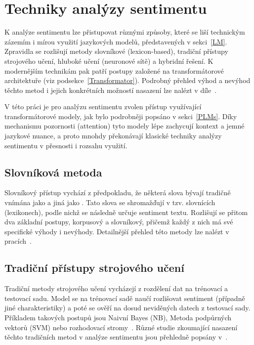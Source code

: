\section{Techniky analýzy sentimentu}\label{TechAnaSen}
K analýze sentimentu lze přistupovat různými způsoby, které se liší technickým zázemím i mírou využití jazykových modelů, představených v sekci~\ref{LM}. Zpravidla se rozlišují metody slovníkové (lexicon-based), tradiční přístupy strojového učení, hluboké učení (neuronové sítě) a hybridní řešení. K modernějším technikám pak patří postupy založené na transformátorové architektuře (viz podsekce~\ref{Transformator}). Podrobný přehled výhod a nevýhod těchto metod i jejich konkrétních možností nasazení lze nalézt v díle~\cite{MAO2024102048}.

V této práci je pro analýzu sentimentu zvolen přístup využívající transformátorové modely, jak bylo podrobněji popsáno v sekci~\ref{PLMs}. Díky mechanismu pozornosti (attention) tyto modely lépe zachycují kontext a jemné jazykové nuance, a proto mnohdy překonávají klasické techniky analýzy sentimentu v přesnosti i rozsahu využití.

\subsection{Slovníková metoda}
Slovníkový přístup vychází z předpokladu, že některá slova bývají tradičně vnímána jako  a jiná jako . Tato slova se shromažďují v tzv. slovnících (lexikonech), podle nichž se následně určuje sentiment textu. Rozlišují se přitom dva základní postupy, korpusový a slovníkový, přičemž každý z nich má své specifické výhody i nevýhody. Detailnější přehled této metody lze nalézt v pracích~\cite{Aqlanstudyofsentiment, MAO2024102048}.

\subsection{Tradiční přístupy strojového učení}
Tradiční metody strojového učení vycházejí z rozdělení dat na trénovací a testovací sadu. Model se na trénovací sadě naučí rozlišovat sentiment (případně jiné charakteristiky) a poté se ověří na dosud neviděných datech z testovací sady. Příkladem takových postupů jsou Naivní Bayes (NB), Metoda podpůrných vektorů (SVM) nebo rozhodovací stromy~\cite{MAO2024102048}. Různé studie zkoumající nasazení těchto tradičních metod v analýze sentimentu jsou přehledně popsány v~\cite{SuryawanshiSA}.

